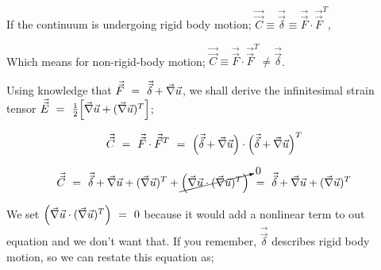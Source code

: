 \documentclass{article}
\begin{document}
If the continuum is undergoing rigid body motion; \begin{math} \vec{\vec{C}} \equiv \vec{\vec{\delta}} \equiv \vec{\vec{F}} \cdot \vec{\vec{F}}^T \end{math},

Which means for non-rigid-body motion; \begin{math} \vec{\vec{C}} \equiv \vec{\vec{F}} \cdot \vec{\vec{F}}^T \neq \vec{\vec{\delta}} \end{math}.

Using knowledge that \begin{math} \vec{\vec{F}} \hspace{0.125cm}  = \hspace{0.125cm} \vec{\vec{\delta}} + \vec{\nabla} \vec{u} \end{math}, we shall derive the infinitesimal strain tensor \begin{math} \vec{\vec{E}} \hspace{0.125cm}  = \hspace{0.125cm} \frac{1}{2} \Big[ \vec{\nabla} \vec{u} + ( \vec{\nabla} \vec{u} )^T \Big] \end{math};

\begin{equation} \label{eq:1}
\vec{\vec{C}} \hspace{0.125cm} = \hspace{0.125cm} \vec{\vec{F}} \cdot \vec{\vec{F}}^T \hspace{0.125cm} = \hspace{0.125cm} \Big( \vec{\vec{\delta}} + \vec{\nabla} \vec{u} \Big) \cdot \Big( \vec{\vec{\delta}} + \vec{\nabla} \vec{u} \Big)^T \hspace{0.125cm} 
\end{equation} 

\begin{equation} \label{eq:1}
\vec{\vec{C}} \hspace{0.125cm} = \hspace{0.125cm} \vec{\vec{\delta}} + \vec{\nabla} \vec{u} + ( \vec{\nabla} \vec{u} )^T + \cancelto{0}{\Big( \vec{\nabla} \vec{u} \cdot ( \vec{\nabla} \vec{u} )^T \Big)} \hspace{0.125cm} = \hspace{0.125cm}  \vec{\vec{\delta}} + \vec{\nabla} \vec{u} + ( \vec{\nabla} \vec{u} )^T \hspace{0.125cm} 
\end{equation} 

We set \begin{math} \Big( \vec{\nabla} \vec{u} \cdot ( \vec{\nabla} \vec{u} )^T \Big) \hspace{0.125cm} = \hspace{0.125cm} 0 \end{math} because it would add a nonlinear term to out equation and we don't want that. If you remember, \begin{math} \vec{\vec{\delta}} \end{math} describes rigid body motion, so we can restate this equation as;
\end{document}
